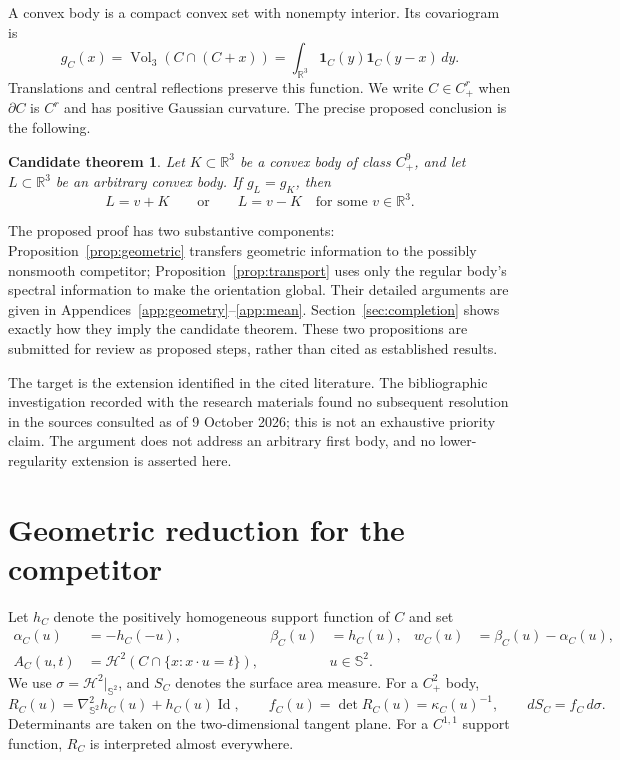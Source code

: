 \documentclass[11pt,a4paper]{article}
\newtheorem{candidate}[theorem]{Candidate theorem}
\theoremstyle{definition}
\theoremstyle{remark}
\newcommand{\R}{\mathbb R}
\newcommand{\Sph}{\mathbb S^2}
\newcommand{\vol}{\operatorname{Vol}_3}
\newcommand{\area}{\mathcal H^2}
\newcommand{\id}{\operatorname{Id}}
\numberwithin{equation}{section}
\begin{document}
A convex body is a compact convex set with nonempty interior. Its
covariogram is
\begin{equation}\label{eq:covariogram}
 g_C(x)=\vol(C\cap(C+x))
       =\int_{\R^3}\mathbf1_C(y)\mathbf1_C(y-x)\,dy .
\end{equation}
Translations and central reflections preserve this function. We write
$C\in C^r_+$ when $\partial C$ is $C^r$ and has positive Gaussian curvature.
The precise proposed conclusion is the following.

\begin{candidate}\label{thm:target}
Let $K\subset\R^3$ be a convex body of class $C^9_+$, and let
$L\subset\R^3$ be an arbitrary convex body. If $g_L=g_K$, then
\[
 L=v+K\qquad\text{or}\qquad L=v-K
 \quad\text{for some }v\in\R^3 .
\]
\end{candidate}

The proposed proof has two substantive components:
Proposition~\ref{prop:geometric} transfers geometric information to the
possibly nonsmooth competitor; Proposition~\ref{prop:transport} uses only
the regular body's spectral information to make the orientation global.
Their detailed arguments are given in Appendices~\ref{app:geometry}--\ref{app:mean}.
Section~\ref{sec:completion} shows exactly how they imply the candidate
theorem. These two propositions are submitted for review as proposed
steps, rather than cited as established results.

The target is the extension identified in the cited literature. The
bibliographic investigation recorded with the research materials found
no subsequent resolution in the sources consulted as of 9 October 2026;
this is not an exhaustive priority claim. The argument does not address
an arbitrary first body, and no lower-regularity extension is asserted here.

\section{Geometric reduction for the competitor}\label{sec:geometry}
Let $h_C$ denote the positively homogeneous support function of $C$ and set
\begin{align}
 \alpha_C(u)&=-h_C(-u),&
 \beta_C(u)&=h_C(u),&
 w_C(u)&=\beta_C(u)-\alpha_C(u),\label{eq:endpoints}\\
 A_C(u,t)&=\area(C\cap\{x:x\cdot u=t\}),&&u\in\Sph .\label{eq:sections}
\end{align}
We use $\sigma=\area|_{\Sph}$, and $S_C$ denotes the surface area measure.
For a $C^2_+$ body,
\begin{equation}\label{eq:radii}
 R_C(u)=\nabla_{\Sph}^2h_C(u)+h_C(u)\id,\qquad
 f_C(u)=\det R_C(u)=\kappa_C(u)^{-1},\qquad dS_C=f_C\,d\sigma .
\end{equation}
Determinants are taken on the two-dimensional tangent plane.
For a $C^{1,1}$ support function, $R_C$ is interpreted almost everywhere.
\end{document}
